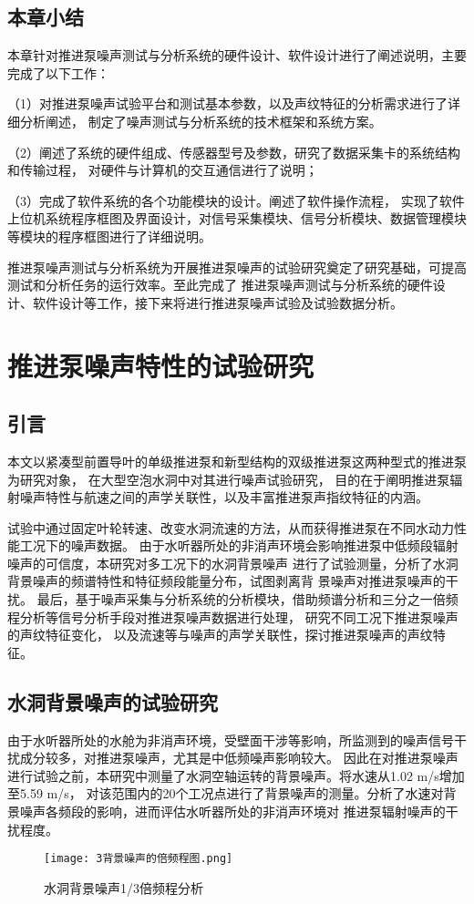 \section{本章小结}
本章针对推进泵噪声测试与分析系统的硬件设计、软件设计进行了阐述说明，主要完成了以下工作：

（1）对推进泵噪声试验平台和测试基本参数，以及声纹特征的分析需求进行了详细分析阐述，
制定了噪声测试与分析系统的技术框架和系统方案。

（2）阐述了系统的硬件组成、传感器型号及参数，研究了数据采集卡的系统结构和传输过程，
对硬件与计算机的交互通信进行了说明；

（3）完成了软件系统的各个功能模块的设计。阐述了软件操作流程，
实现了软件上位机系统程序框图及界面设计，对信号采集模块、信号分析模块、数据管理模块等模块的程序框图进行了详细说明。

推进泵噪声测试与分析系统为开展推进泵噪声的试验研究奠定了研究基础，可提高测试和分析任务的运行效率。至此完成了
推进泵噪声测试与分析系统的硬件设计、软件设计等工作，接下来将进行推进泵噪声试验及试验数据分析。

\chapter{推进泵噪声特性的试验研究}\label{ch:chapter3}
\section{引言}
本文以紧凑型前置导叶的单级推进泵和新型结构的双级推进泵这两种型式的推进泵为研究对象，
在大型空泡水洞中对其进行噪声试验研究，
目的在于阐明推进泵辐射噪声特性与航速之间的声学关联性，以及丰富推进泵声指纹特征的内涵。

试验中通过固定叶轮转速、改变水洞流速的方法，从而获得推进泵在不同水动力性能工况下的噪声数据。
由于水听器所处的非消声环境会影响推进泵中低频段辐射噪声的可信度，本研究对多工况下的水洞背景噪声
进行了试验测量，分析了水洞背景噪声的频谱特性和特征频段能量分布，试图剥离背
景噪声对推进泵噪声的干扰。
最后，基于噪声采集与分析系统的分析模块，借助频谱分析和三分之一倍频程分析等信号分析手段对推进泵噪声数据进行处理，
研究不同工况下推进泵噪声的声纹特征变化，
以及流速等与噪声的声学关联性，探讨推进泵噪声的声纹特征。
\section{水洞背景噪声的试验研究}
由于水听器所处的水舱为非消声环境，受壁面干涉等影响，所监测到的噪声信号干扰成分较多，对推进泵噪声，尤其是中低频噪声影响较大。
因此在对推进泵噪声进行试验之前，本研究中测量了水洞空轴运转的背景噪声。将水速从1.02 m/s增加至5.59 m/s，
对该范围内的20个工况点进行了背景噪声的测量。分析了水速对背景噪声各频段的影响，进而评估水听器所处的非消声环境对
推进泵辐射噪声的干扰程度。
\begin{figure}[htbp]
    \centering
    \texttt{[image: 3背景噪声的倍频程图.png]}
    \caption{\label{fig:otcbeijing}水洞背景噪声1/3倍频程分析}
\end{figure}

